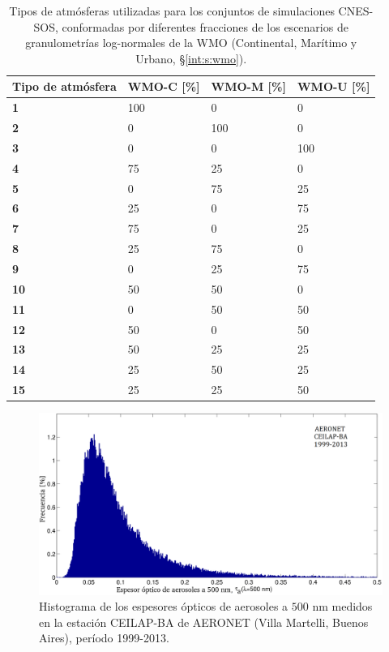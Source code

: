         \begin{table}
        \caption{Tipos de atmósferas utilizadas para los conjuntos de simulaciones CNES-SOS, conformadas por diferentes fracciones de los escenarios de granulometrías log-normales de la WMO (Continental, Marítimo y Urbano, \S \ref{int:s:wmo}).}
        \begin{tabular}{|l|l|l|l|}
        \hline
        \textbf{Tipo de atmósfera} & \textbf{WMO-C [\%]} & \textbf{WMO-M [\%]} & \textbf{WMO-U [\%]} \\ \hline
        \textbf{1}   & 100 & 0   & 0   \\ \hline
        \textbf{2}   & 0   & 100 & 0   \\ \hline
        \textbf{3}   & 0   & 0   & 100 \\ \hline
        \textbf{4}   & 75  & 25  & 0   \\ \hline
        \textbf{5}   & 0   & 75  & 25  \\ \hline
        \textbf{6}   & 25  & 0   & 75  \\ \hline
        \textbf{7}   & 75  & 0   & 25  \\ \hline
        \textbf{8}   & 25  & 75  & 0   \\ \hline
        \textbf{9}   & 0   & 25  & 75  \\ \hline
        \textbf{10}  & 50  & 50  & 0   \\ \hline
        \textbf{11}  & 0   & 50  & 50  \\ \hline
        \textbf{12}  & 50  & 0   & 50  \\ \hline
        \textbf{13}  & 50  & 25  & 25  \\ \hline
        \textbf{14}  & 25  & 50  & 25  \\ \hline
        \textbf{15}  & 25  & 25  & 50  \\ \hline
        \end{tabular}
        \label{pca:tab:wmo}
        \end{table}
        
        \begin{figure}
        \centering
        \includegraphics[width=\textwidth]{pca/figures/TAU_AERONET.png}
        \caption[Espesores ópticos de aerosoles a $500$ nm medidos en la estación CEILAP-BA de AERONET.]{Histograma de los espesores ópticos de aerosoles a $500$ nm medidos en la estación CEILAP-BA de AERONET (Villa Martelli, Buenos Aires), período 1999-2013.}
        \label{pca:TAU_AERONET}
        \end{figure}
        
